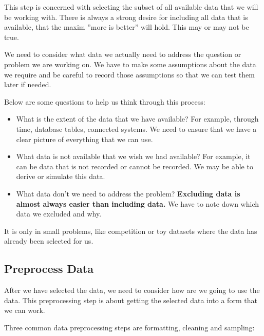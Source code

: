\documentclass[11pt]{article}
\begin{document}
    This step is concerned with selecting the subset of all available data that we will be working with.
    There is always a strong desire for including all data that is available, that the maxim ''more is better'' will hold.
    This may or may not be true.

    We need to consider what data we actually need to address the question or problem we are working on.
    We have to make some assumptions about the data we require and be careful to record those assumptions so that we can test them later if needed.

    \vspace{5mm}

    Below are some questions to help us think through this process:

    \begin{itemize}

        \item What is the extent of the data that we have available?
        For example, through time, database tables, connected systems.
        We need to ensure that we have a clear picture of everything that we can use.

        \item What data is not available that we wish we had available?
        For example, it can be data that is not recorded or cannot be recorded.
        We may be able to derive or simulate this data.

        \item What data don't we need to address the problem?
        \textbf{Excluding data is almost always easier than including data.}
        We have to note down which data we excluded and why.

    \end{itemize}

    It is only in small problems, like competition or toy datasets where the data has already been selected for us.

    \subsection{Preprocess Data} \label{subsec:preproc_data}

    After we have selected the data, we need to consider how are we going to use the data.
    This preprocessing step is about getting the selected data into a form that we can work.

    Three common data preprocessing steps are formatting, cleaning and sampling:
\end{document}

